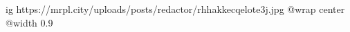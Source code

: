  
 
 
 
 

\ifcmt
  ig https://mrpl.city/uploads/posts/redactor/rhhakkecqelote3j.jpg
  @wrap center
  @width 0.9
\fi
